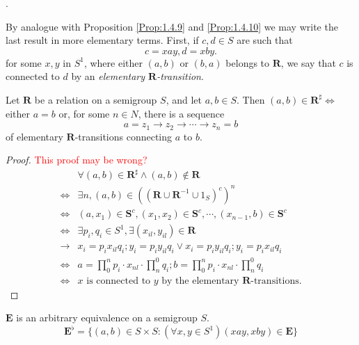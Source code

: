 \begin{Def}.

    By analogue with Proposition \ref{Prop:1.4.9} and \ref{Prop:1.4.10} we may write the last result in more elementary terms. First, if $c, d \in S$ are such that
    \[
        c = xay, d = xby.
    \]
for some $x, y$ in $S^1$, where either $(a, b)$ or $(b, a)$ belongs to $\mathbf{R}$, we say that $c$ is connected to $d$ by an \emph{elementary $\mathbf{R}$-transition}.
\end{Def}

\begin{Prop}\label{Prop:1.5.9}
    Let $\mathbf{R}$ be a relation on a semigroup $S$, and let $a, b \in S$. Then $(a, b)\in \mathbf{R}^{\sharp} \Leftrightarrow $either $a=b$ or, for some $n \in N$, there is a sequence
    \[
        a = z_1 \rightarrow z_2 \rightarrow \cdots \rightarrow z_n = b
    \]
    of elementary $\mathbf{R}$-transitions connecting $a$ to $b$.
    \begin{proof}
        \textcolor{red}{This proof may be wrong?}
        \begin{align*}
            & \forall (a, b) \in \mathbf{R}^{\sharp} \wedge (a, b) \notin \mathbf{R}  \\
            \Leftrightarrow& \exists n, (a, b) \in ((\mathbf{R} \cup \mathbf{R}^{-1} \cup 1_S)^c)^n   \\
            \Leftrightarrow& (a, x_1) \in \mathbf{S}^c, (x_1, x_2) \in \mathbf{S}^c, \cdots, (x_{n-1}, b) \in \mathbf{S}^c   \\
            \Leftrightarrow& \exists p_i, q_i \in S^1, \exists (x_{il}, y_{il}) \in \mathbf{R}  \\
            \rightarrow&  x_i = p_i x_{il} q_i; y_{i} = p_i y_{il} q_i \vee
            x_i = p_i y_{il} q_i; y_{i} = p_i x_{il} q_i    \\
            \Leftrightarrow& a = \prod_{0}^{n} p_i \cdot x_{nl} \cdot \prod_{n}^{0} q_i; b = \prod_{0}^{n} p_i \cdot x_{nl} \cdot \prod_{n}^{0} q_i \\
            \Leftrightarrow& x \text{ is connected to }y \text{ by the elementary } \mathbf{R} \text{-transitions.}
        \end{align*}
    \end{proof}
\end{Prop}

\begin{Def}
    $\mathbf{E}$ is an arbitrary equivalence on a semigroup $S$.
    \[
    \mathbf{E}^{\flat}=
    \{
        (a,b) \in S \times S: (\forall x, y \in S^1)(xay,xby) \in \mathbf{E}
    \}
\]
\end{Def}

